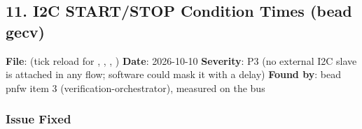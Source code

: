\subsection{\texorpdfstring{11. I2C START/\allowbreak{}STOP Condition
Times (bead gecv)}{11. I2C START/STOP Condition Times (bead gecv)}}\label{cr:fix:fixes-index:11-i2c-startstop-condition-times-bead-gecv}

\begin{record}

\textbf{File}:  (tick reload for
, , , )
\textbf{Date}: 2026-10-10 \textbf{Severity}: P3 (no external I2C slave
is attached in any flow; software could mask it with a delay)
\textbf{Found by}: bead pnfw item 3 (verification-orchestrator),
measured on the bus

\end{record}

\subsubsection{Issue Fixed}\label{cr:fix:fixes-index:issue-fixed-4}

